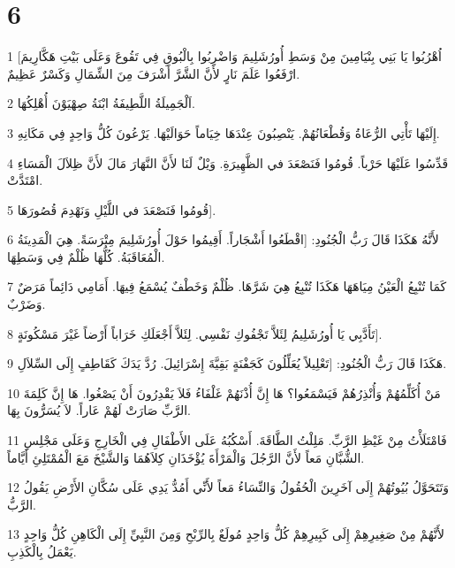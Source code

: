 \chapter{6}

\par 1 [اُهْرُبُوا يَا بَنِي بِنْيَامِينَ مِنْ وَسَطِ أُورُشَلِيمَ وَاضْرِبُوا بِالْبُوقِ فِي تَقُوعَ وَعَلَى بَيْتِ هَكَّارِيمَ ارْفَعُوا عَلَمَ نَارٍ لأَنَّ الشَّرَّ أَشْرَفَ مِنَ الشِّمَالِ وَكَسْرٌ عَظِيمٌ.
\par 2 اَلْجَمِيلَةُ اللَّطِيفَةُ ابْنَةُ صِهْيَوْنَ أُهْلِكُهَا.
\par 3 إِلَيْهَا تَأْتِي الرُّعَاةُ وَقُطْعَانُهُمْ. يَنْصِبُونَ عِنْدَهَا خِيَاماً حَوَالَيْهَا. يَرْعُونَ كُلُّ وَاحِدٍ فِي مَكَانِهِ.
\par 4 قَدِّسُوا عَلَيْهَا حَرْباً. قُومُوا فَنَصْعَدَ في الظَّهِيرَةِ. وَيْلٌ لَنَا لأَنَّ النَّهَارَ مَالَ لأَنَّ ظِلاَلَ الْمَسَاءِ امْتَدَّتْ.
\par 5 قُومُوا فَنَصْعَدَ في اللَّيْلِ وَنَهْدِمَ قُصُورَهَا].
\par 6 لأَنَّهُ هَكَذَا قَالَ رَبُّ الْجُنُودِ: [اقْطَعُوا أَشْجَاراً. أَقِيمُوا حَوْلَ أُورُشَلِيمَ مِتْرَسَةً. هِيَ الْمَدِينَةُ الْمُعَاقَبَةُ. كُلُّهَا ظُلْمٌ فِي وَسَطِهَا.
\par 7 كَمَا تُنْبِعُ الْعَيْنُ مِيَاهَهَا هَكَذَا تُنْبِعُ هِيَ شَرَّهَا. ظُلْمٌ وَخَطْفٌ يُسْمَعُ فِيهَا. أَمَامِي دَائِماً مَرَضٌ وَضَرْبٌ.
\par 8 تَأَدَّبِي يَا أُورُشَلِيمُ لِئَلاَّ تَجْفُوكِ نَفْسِي. لِئَلاَّ أَجْعَلَكِ خَرَاباً أَرْضاً غَيْرَ مَسْكُونَةٍ].
\par 9 هَكَذَا قَالَ رَبُّ الْجُنُودِ: [تَعْلِيلاً يُعَلِّلُونَ كَجَفْنَةٍ بَقِيَّةَ إِسْرَائِيلَ. رُدَّ يَدَكَ كَقَاطِفٍ إِلَى السِّلاَلِ.
\par 10 مَنْ أُكَلِّمُهُمْ وَأُنْذِرُهُمْ فَيَسْمَعُوا؟ هَا إِنَّ أُذْنَهُمْ غَلْفَاءُ فَلاَ يَقْدِرُونَ أَنْ يَصْغُوا. هَا إِنَّ كَلِمَةَ الرَّبِّ صَارَتْ لَهُمْ عَاراً. لاَ يُسَرُّونَ بِهَا.
\par 11 فَامْتَلَأْتُ مِنْ غَيْظِ الرَّبِّ. مَلِلْتُ الطَّاقَةَ. أَسْكُبُهُ عَلَى الأَطْفَالِ فِي الْخَارِجِ وَعَلَى مَجْلِسِ الشُّبَّانِ مَعاً لأَنَّ الرَّجُلَ وَالْمَرْأَةَ يُؤْخَذَانِ كِلاَهُمَا وَالشَّيْخَ مَعَ الْمُمْتَلِئِ أَيَّاماً.
\par 12 وَتَتَحَوَّلُ بُيُوتُهُمْ إِلَى آخَرِينَ الْحُقُولُ وَالنِّسَاءُ مَعاً لأَنِّي أَمُدُّ يَدِي عَلَى سُكَّانِ الأَرْضِ يَقُولُ الرَّبُّ.
\par 13 لأَنَّهُمْ مِنْ صَغِيرِهِمْ إِلَى كَبِيرِهِمْ كُلُّ وَاحِدٍ مُولَعٌ بِالرِّبْحِ وَمِنَ النَّبِيِّ إِلَى الْكَاهِنِ كُلُّ وَاحِدٍ يَعْمَلُ بِالْكَذِبِ.
